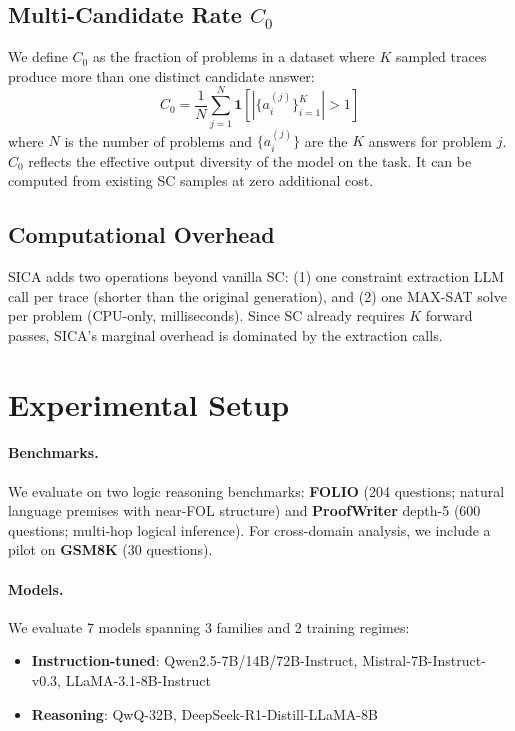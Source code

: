 \documentclass[11pt,a4paper]{article}
\begin{document}
\subsection{Multi-Candidate Rate $C_0$}

We define $C_0$ as the fraction of problems in a dataset where $K$ sampled traces produce more than one distinct candidate answer:
\begin{equation}
C_0 = \frac{1}{N} \sum_{j=1}^{N} \mathbf{1}\left[|\{a_i^{(j)}\}_{i=1}^{K}| > 1\right]
\end{equation}
where $N$ is the number of problems and $\{a_i^{(j)}\}$ are the $K$ answers for problem $j$. $C_0$ reflects the effective output diversity of the model on the task. It can be computed from existing SC samples at zero additional cost.

\subsection{Computational Overhead}

SICA adds two operations beyond vanilla SC: (1) one constraint extraction LLM call per trace (shorter than the original generation), and (2) one MAX-SAT solve per problem (CPU-only, milliseconds). Since SC already requires $K$ forward passes, SICA's marginal overhead is dominated by the extraction calls.

\section{Experimental Setup}
\label{sec:setup}

\paragraph{Benchmarks.} We evaluate on two logic reasoning benchmarks: \textbf{FOLIO} (204 questions; natural language premises with near-FOL structure) and \textbf{ProofWriter} depth-5 (600 questions; multi-hop logical inference). For cross-domain analysis, we include a pilot on \textbf{GSM8K} (30 questions).

\paragraph{Models.} We evaluate 7 models spanning 3 families and 2 training regimes:
\begin{itemize}
\item \textbf{Instruction-tuned}: Qwen2.5-7B/14B/72B-Instruct, Mistral-7B-Instruct-v0.3, LLaMA-3.1-8B-Instruct
\item \textbf{Reasoning}: QwQ-32B, DeepSeek-R1-Distill-LLaMA-8B
\end{itemize}
\end{document}
